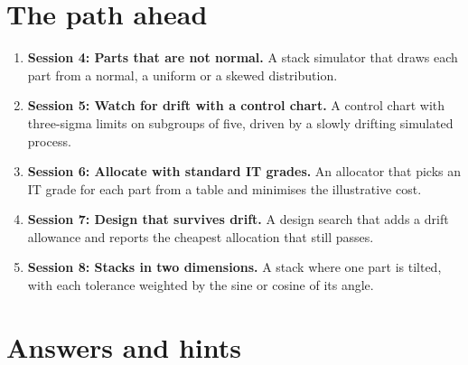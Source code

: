 \documentclass[11pt,a4paper]{article}
\begin{document}
\section{The path ahead}
\begin{enumerate}[nosep]
\item \textbf{Session 4: Parts that are not normal.} A stack simulator that draws each part from a normal, a uniform or a skewed distribution.
\item \textbf{Session 5: Watch for drift with a control chart.} A control chart with three-sigma limits on subgroups of five, driven by a slowly drifting simulated process.
\item \textbf{Session 6: Allocate with standard IT grades.} An allocator that picks an IT grade for each part from a table and minimises the illustrative cost.
\item \textbf{Session 7: Design that survives drift.} A design search that adds a drift allowance and reports the cheapest allocation that still passes.
\item \textbf{Session 8: Stacks in two dimensions.} A stack where one part is tilted, with each tolerance weighted by the sine or cosine of its angle.
\end{enumerate}

\section{Answers and hints}
\end{document}

